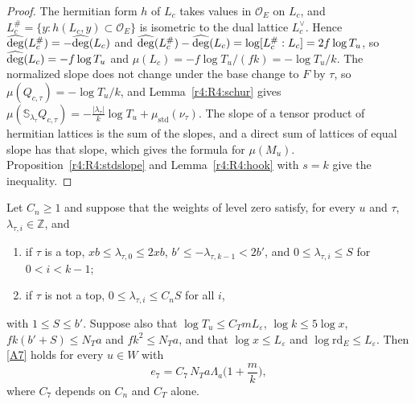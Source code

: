 \begin{proof}
The hermitian form $h$ of $L_c$ takes values in $\mathcal O_E$ on $L_c$, and $L_c^\#=\{y:h(L_c,y)\subset\mathcal O_E\}$ is isometric to the dual lattice $L_c^\vee$. Hence $\widehat{\deg}(L_c^\#)=-\widehat{\deg}(L_c)$ and $\widehat{\deg}(L_c^\#)-\widehat{\deg}(L_c)=\log[L_c^\#:L_c]=2f\log T_u$, so $\widehat{\deg}(L_c)=-f\log T_u$ and $\mu(L_c)=-f\log T_u/(fk)=-\log T_u/k$. The normalized slope does not change under the base change to $F$ by $\tau$, so $\mu(Q_{c,\tau})=-\log T_u/k$, and Lemma~\ref{r4:R4:schur} gives $\mu(\mathbb S_{\lambda_\tau}Q_{c,\tau})=-\frac{\lvert\lambda_\tau\rvert}k\log T_u+\mu_{\mathrm{std}}(\nu_\tau)$. The slope of a tensor product of hermitian lattices is the sum of the slopes, and a direct sum of lattices of equal slope has that slope, which gives the formula for $\mu(M_u)$. Proposition~\ref{r4:R4:stdslope} and Lemma~\ref{r4:R4:hook} with $s=k$ give the inequality.
\end{proof}

\begin{theorem}\label{r4:R4:A7}
Let $C_n\ge1$ and suppose that the weights of level zero satisfy, for every $u$ and $\tau$, $\lambda_{\tau,i}\in\mathbb Z$, and
\begin{enumerate}
\item[(W1)] if $\tau$ is a top, $xb\le\lambda_{\tau,0}\le2xb$, $b'\le-\lambda_{\tau,k-1}<2b'$, and $0\le\lambda_{\tau,i}\le S$ for $0<i<k-1$;
\item[(W2)] if $\tau$ is not a top, $0\le\lambda_{\tau,i}\le C_nS$ for all $i$,
\end{enumerate}
with $1\le S\le b'$. Suppose also that $\log T_u\le C_TmL_\varepsilon$, $\log k\le5\log x$, $fk(b'+S)\le N_Ta$ and $fk^2\le N_Ta$, and that $\log x\le L_\varepsilon$ and $\log\mathrm{rd}_E\le L_\varepsilon$. Then \eqref{A7} holds for every $u\in W$ with
\[
e_7=C_7\,N_Ta\Lambda_a\Big(1+\frac mk\Big),
\]
where $C_7$ depends on $C_n$ and $C_T$ alone.
\end{theorem}

